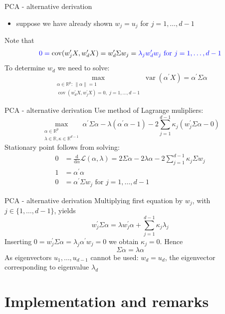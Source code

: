 \documentclass[pdf, handout]{beamer}
\newcommand{\var}{\operatorname{var}}
\newcommand{\rd}{\mathrm{d}}
\newcommand{\cov}{\operatorname{cov}}
\begin{document}
\begin{frame}{PCA - alternative derivation}
\begin{itemize}
\item suppose we have already shown $w_j=u_j$ for $j=1,\dots,d-1$
\end{itemize}
Note that
\begin{align*}
\color{blue} 0=\color{black}\cov( w_j^\prime X, w_d^\prime X)=w_d^\prime \Sigma w_j=
\color{blue} \lambda_j w_d^\prime w_j \text{ for } j=1,\dots,d-1
\end{align*}
To determine $w_d$ we need to solve:
\[
\max_{\substack{ \alpha \in\mathbb{R}^p :\, \| \alpha \|=1 \\ 
\cov(w_d^\prime X, w_j^\prime X)=0,\,\, j=1,\dots,d-1 }} \var ( \alpha^\prime X) = \alpha^\prime \Sigma \alpha
\]
\end{frame}

\begin{frame}{PCA - alternative derivation}
Use method of Lagrange mulipliers:
\[
\max_{\substack{\alpha \in\mathbb{R}^p \\ \lambda\in\mathbb{R},\kappa\in\mathbb{R}^{d-1}}}  \alpha^\prime \Sigma \alpha - \lambda (   \alpha^\prime \alpha -1)
-2\sum_{j=1}^{d-1} \kappa_j ( w_j^\prime \Sigma\alpha -0)
\]
Stationary point follows from solving:
\begin{align*}
0&=\frac{\rd}{\rd \alpha} \mathcal{L}(\alpha,\lambda) = 2\Sigma \alpha -  2\lambda \alpha- 2\sum_{j=1}^{d-1}\kappa_j \Sigma w_j \\
1&=\alpha^\prime \alpha \\
0&=\alpha^\prime\Sigma  w_j \text{ for } j=1,\dots,d-1
\end{align*}
\end{frame}

\begin{frame}{PCA - alternative derivation}
Multiplying first equation by $w_j$, with $j\in\{1,\dots,d-1\}$, yields
\[
w_j^\prime \Sigma \alpha =\lambda w_j^\prime \alpha + \sum_{j=1}^{d-1} \kappa_j \lambda_j 
\]
Inserting $0=w_j^\prime \Sigma \alpha =  \lambda_j \alpha^\prime w_j =0$ we obtain \color{blue} $\kappa_j=0$.
\color{black} Hence
\[
\Sigma \alpha = \lambda\alpha
\]
As eigenvectors $u_1,\dots,u_{d-1}$ cannot be used: $w_d = u_d$, the eigenvector corresponding to eigenvalue $\lambda_d$
\end{frame}


\section{Implementation and remarks}
\end{document}
